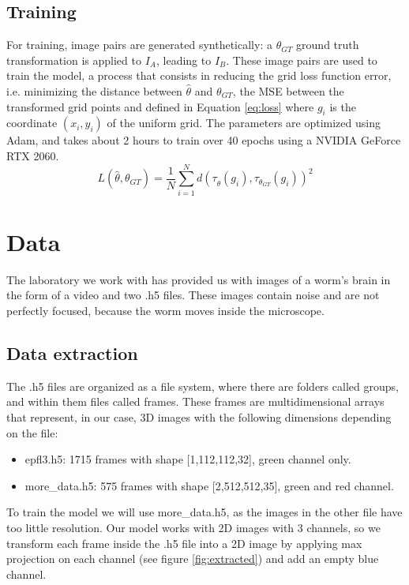 \documentclass[10pt,conference,compsocconf]{IEEEtran}
\begin{document}
\subsection{Training}
For training, image pairs are generated synthetically: a ${\theta}_{GT}$ ground truth transformation is applied to $I_{A}$, leading to $I_{B}$. These image pairs are used to train the model, a process that consists in reducing the grid loss function error, i.e. minimizing the distance between $\hat{\theta}$ and ${\theta}_{GT}$, the MSE between the transformed grid points and defined in Equation \ref{eq:loss} where $g_i$ is the coordinate
$(x_i, y_i)$ of the uniform grid. 
The parameters are optimized using Adam, and takes about 2 hours to train over 40 epochs using a NVIDIA GeForce RTX 2060.
\begin{equation}
  \label{eq:loss}
  L(\hat{\theta}, \theta_{GT}) = \frac{1}{N} \sum_{i=1}^{N} d(\tau_{\hat{\theta}}(g_i), \tau_{\theta_{GT}}(g_i))^2
\end{equation}




\section{\textbf{Data}}
The laboratory we work with has provided us with images of a worm's brain in the form of a video and two .h5 files. These images contain noise and are not perfectly focused, because the worm moves inside the microscope.

\subsection{Data extraction}
The .h5 files are organized as a file system, where there are folders called groups, and within them files called frames. These frames are multidimensional arrays that represent, in our case, 3D images with the following dimensions depending on the file:

\begin{itemize}
    \item {epfl3.h5}: 1715 frames with shape [1,112,112,32], green channel only.
    \item {more\_data.h5}: 575 frames with shape [2,512,512,35], green and red channel.
\end{itemize}

To train the model we will use more\_data.h5, as the images in the other file have too little resolution. Our model works with 2D images with 3 channels, so we transform each frame inside the .h5 file into a 2D image by applying max projection on each channel (see figure \ref{fig:extracted}) and add an empty blue channel.
\end{document}
